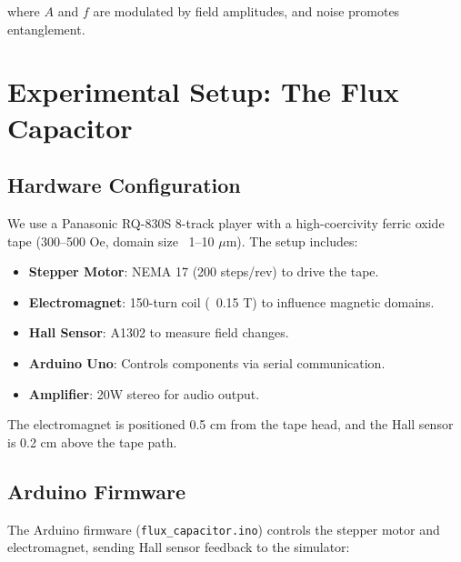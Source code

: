\documentclass[12pt]{article}
\begin{document}
where \( A \) and \( f \) are modulated by field amplitudes, and noise promotes entanglement.

\section{Experimental Setup: The Flux Capacitor}
\label{sec:experiment}

\subsection{Hardware Configuration}

We use a Panasonic RQ-830S 8-track player with a high-coercivity ferric oxide tape (300–500 Oe, domain size ~1–10 \( \mu \)m). The setup includes:

\begin{itemize}
    \item \textbf{Stepper Motor}: NEMA 17 (200 steps/rev) to drive the tape.
    \item \textbf{Electromagnet}: 150-turn coil (~0.15 T) to influence magnetic domains.
    \item \textbf{Hall Sensor}: A1302 to measure field changes.
    \item \textbf{Arduino Uno}: Controls components via serial communication.
    \item \textbf{Amplifier}: 20W stereo for audio output.
\end{itemize}

The electromagnet is positioned 0.5 cm from the tape head, and the Hall sensor is 0.2 cm above the tape path.

\subsection{Arduino Firmware}

The Arduino firmware (\texttt{flux\_capacitor.ino}) controls the stepper motor and electromagnet, sending Hall sensor feedback to the simulator:
\end{document}
